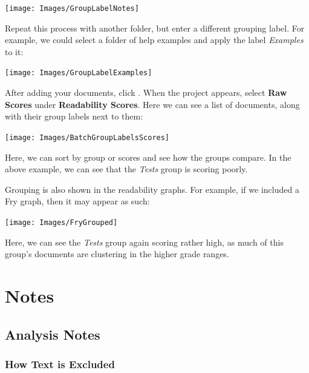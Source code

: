 \documentclass[
]{book}
\theoremstyle{definition}
\theoremstyle{definition}
\theoremstyle{definition}
\theoremstyle{definition}
\theoremstyle{remark}
\begin{document}
\begin{center}\texttt{[image: Images/GroupLabelNotes]} \end{center}

Repeat this process with another folder, but enter a different grouping label. For example, we could select a folder of help examples and apply the label \emph{Examples} to it:

\begin{center}\texttt{[image: Images/GroupLabelExamples]} \end{center}

After adding your documents, click . When the project appears, select \textbf{Raw Scores} under \textbf{Readability Scores}. Here we can see a list of documents, along with their group labels next to them:

\begin{center}\texttt{[image: Images/BatchGroupLabelsScores]} \end{center}

Here, we can sort by group or scores and see how the groups compare. In the above example, we can see that the \emph{Tests} group is scoring poorly.

Grouping is also shown in the readability graphs. For example, if we included a Fry graph, then it may appear as such:

\begin{center}\texttt{[image: Images/FryGrouped]} \end{center}

Here, we can see the \emph{Tests} group again scoring rather high, as much of this group's documents are clustering in the higher grade ranges.

\hypertarget{part-notes}{%
\part{Notes}\label{part-notes}}

\hypertarget{analysis-notes}{%
\chapter{Analysis Notes}\label{analysis-notes}}

\hypertarget{how-text-is-excluded}{%
\section{How Text is Excluded}\label{how-text-is-excluded}}
\end{document}
